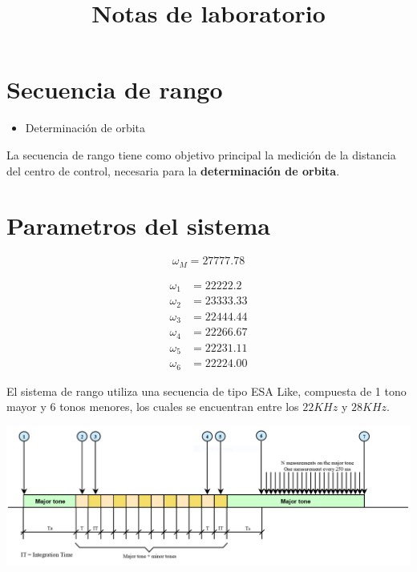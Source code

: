 \documentclass[11pt]{article}
\title{Notas de laboratorio}
\providecommand{\tightlist}{%
      \setlength{\itemsep}{0pt}\setlength{\parskip}{0pt}}
\begin{document}
    \maketitle




    \hypertarget{secuencia-de-rango}{%
\section{Secuencia de rango}\label{secuencia-de-rango}}

    \begin{itemize}
\tightlist
\item
  Determinación de orbita
\end{itemize}

    La secuencia de rango tiene como objetivo principal la medición de la
distancia del centro de control, necesaria para la \textbf{determinación
de orbita}.

    \hypertarget{parametros-del-sistema}{%
\section{Parametros del sistema}\label{parametros-del-sistema}}

    \[
\omega_M = 27777.78
\]


\begin{align}
\omega_1 &= 22222.2 \\
\omega_2 &= 23333.33 \\
\omega_3 &= 22444.44 \\
\omega_4 &= 22266.67 \\
\omega_5 &= 22231.11 \\
\omega_6 &= 22224.00
\end{align}


    El sistema de rango utiliza una secuencia de tipo ESA Like, compuesta de
1 tono mayor y 6 tonos menores, los cuales se encuentran entre los
\(22 KHz\) y \(28 KHz\).

    \includegraphics{./diagrams/range_sequence.png}
\end{document}
